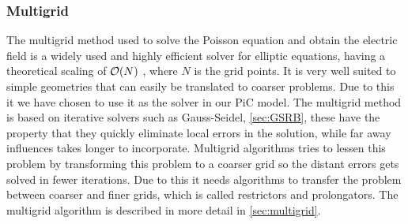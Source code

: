     \subsubsection{Multigrid}

        The multigrid method used to solve the Poisson equation and obtain the
        electric field is a widely used and highly efficient solver for elliptic equations,
        having a theoretical scaling of \(\order{N}\) \citep{press_numerical_1988},
        where \(N\) is the grid points. It is very well suited to simple geometries
        that can easily be translated to coarser problems. Due to this it we have chosen
        to use it as the solver in our PiC model.
        The multigrid method is based on iterative
        solvers such as Gauss-Seidel, \cref{sec:GSRB}, these have the property
        that they quickly eliminate local errors in the solution, while far
        away influences takes longer to incorporate. Multigrid algorithms tries
        to lessen this problem by transforming this problem to a coarser grid
        so the distant errors gets solved in fewer iterations. Due to this it needs
        algorithms to transfer the problem between coarser and finer grids, which
        is called restrictors and prolongators. The multigrid algorithm is described in
        more detail in \cref{sec:multigrid}.
